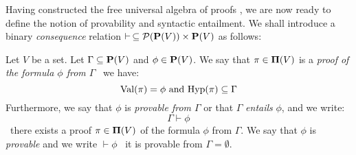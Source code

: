 Having constructed the free universal algebra of proofs \pvs, we are
now ready to define the notion of provability and syntactic
entailment. We shall introduce a binary {\em consequence} relation
$\vdash\,\subseteq {\cal P}(\mbox{${\bf P}(V)$})\times\mbox{${\bf P}(V)$}$ as follows:

\begin{defin}\label{logic:def:FOPL:proof:of:formula}
Let $V$ be a set. Let $\Gamma\subseteq\mbox{${\bf P}(V)$}$ and $\phi\in\mbox{${\bf P}(V)$}$. We say
that $\pi\in\mbox{${\bf\Pi}(V)$}$ is a {\em proof of the formula $\phi$ from
$\Gamma$} \ifand\ we have:
    \[
    \val(\pi)=\phi\mbox{\ and\ }\hyp(\pi)\subseteq\Gamma
    \]
Furthermore, we say that $\phi$ is {\em provable from $\Gamma$} or
that $\Gamma$ {\em entails} $\phi$, and we write:
    \[
    \Gamma\vdash\phi
    \]
\ifand\ there exists a proof $\pi\in\mbox{${\bf\Pi}(V)$}$ of the formula $\phi$ from
$\Gamma$. We say that $\phi$ is {\em provable} and we write
$\vdash\phi$ \ifand\ it is provable from $\Gamma=\emptyset$.
\end{defin}


